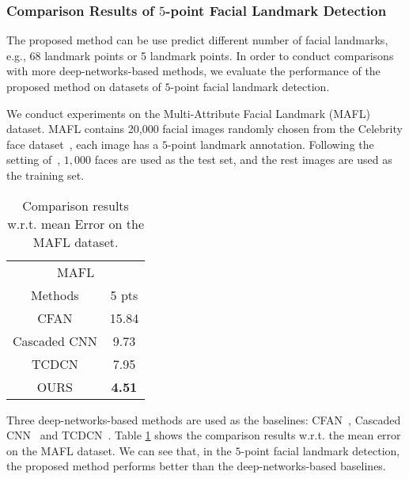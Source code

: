 \documentclass[journal]{IEEEtran}
\begin{document}
\subsubsection{Comparison Results of $5$-point Facial Landmark Detection}
The proposed method can be use predict different number of facial landmarks, e.g., 68 landmark points or 5 landmark points. In order to conduct comparisons with more deep-networks-based methods, we evaluate the performance of the proposed method on datasets of $5$-point facial landmark detection.

We conduct experiments on the Multi-Attribute Facial Landmark (MAFL) dataset. MAFL contains 20,000 facial images randomly chosen from the Celebrity face dataset~\cite{sun2014deep}, each image has a $5$-point landmark annotation. Following the setting of~\cite{zhang2015learning}, $1,000$ faces are used as the test set, and the rest images are used as the training set.

\begin{table}[h]
\small
    \centering \caption{Comparison results w.r.t. mean Error on the MAFL dataset.}
    \begin{tabular}{c c }
        \hline
 \multicolumn{2}{c}{MAFL} \\
Methods & 5 pts \\
        \hline

 CFAN & 15.84 \\

 Cascaded CNN & 9.73   \\

 TCDCN & 7.95   \\
 \hline

 OURS & \textbf{4.51} \\
 \hline
        \end{tabular}
    \label{MAFL}
\end{table}


Three deep-networks-based methods are used as the baselines: CFAN~\cite{zhang2014coarse}, Cascaded CNN~\cite{sun2013deep} and TCDCN~\cite{zhang2015learning}. Table \ref{MAFL} shows the comparison results w.r.t. the mean error on the MAFL dataset. We can see that, in the $5$-point facial landmark detection, the proposed method performs better than the deep-networks-based baselines.
\end{document}
